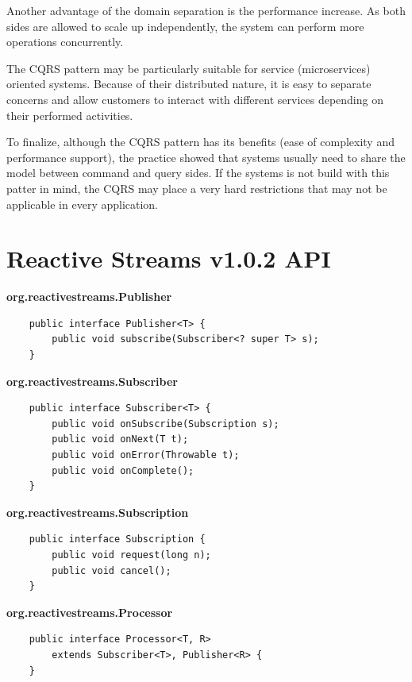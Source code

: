 \documentclass[oneside,
  digital, %
  table,   %
  lof,     %
  lot,     %
]{fithesis3}
\begin{document}
Another advantage of the domain separation is the performance increase. As both sides are allowed to scale up independently, the system can perform more operations concurrently.

The CQRS pattern may be particularly suitable for service (microservices) oriented systems. Because of their distributed nature, it is easy to separate concerns and allow customers to interact with different services depending on their performed activities.

To finalize, although the CQRS pattern has its benefits (ease of complexity and performance support), the practice showed that systems usually need to share the model between command and query sides. If the systems is not build with this patter in mind, the CQRS may place a very hard restrictions that may not be applicable in every application.


\clearpage
\chapter{Reactive Streams v1.0.2 API}
\label{reactive_streams}

\noindent
\textbf{org.reactivestreams.Publisher}

\begin{verbatim}
    public interface Publisher<T> {
        public void subscribe(Subscriber<? super T> s);
    }
\end{verbatim}

\noindent
\textbf{org.reactivestreams.Subscriber}

\begin{verbatim}
    public interface Subscriber<T> {
        public void onSubscribe(Subscription s);
        public void onNext(T t);
        public void onError(Throwable t);
        public void onComplete();
    }
\end{verbatim}

\noindent
\textbf{org.reactivestreams.Subscription}

\begin{verbatim}
    public interface Subscription {
        public void request(long n);
        public void cancel();
    }
\end{verbatim}

\noindent
\textbf{org.reactivestreams.Processor}

\begin{verbatim}
    public interface Processor<T, R> 
        extends Subscriber<T>, Publisher<R> {
    }
\end{verbatim}
\end{document}
